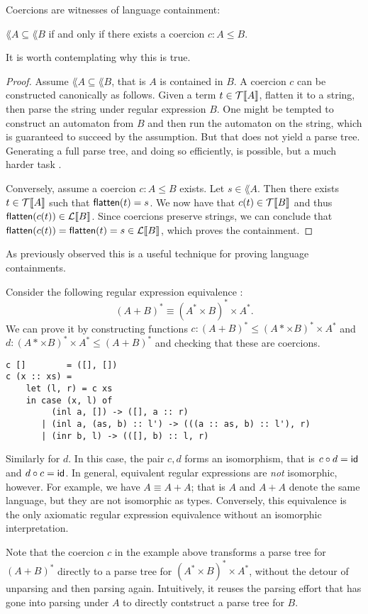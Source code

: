 Coercions are witnesses of language containment:
\begin{proposition}
$\lang{A} \subseteq \lang{B}$ if and only if there exists a coercion $c : A \leq B$.
\end{proposition}
It is worth contemplating why this is true.
\begin{proof}
Assume $\lang{A} \subseteq \lang{B}$, that is $A$ is contained in $B$.  A coercion $c$ can be constructed canonically as follows.
Given a term $t \in \mathcal{T}\llbracket A \rrbracket$, flatten it to a string, then parse the string under regular expression $B$.  One might be tempted to construct an automaton from $B$ and then run the automaton on the string, which is guaranteed to succeed by the assumption.  But that does not yield a parse tree.  Generating a full parse tree, and doing so efficiently, is possible, but a much harder task \cite{frca2004,ghrst2016}.  

Conversely, assume a coercion $c : A \leq B$ exists. Let $s \in \lang{A}$.  
Then there exists $t \in \mathcal{T}\llbracket A \rrbracket$ such that $\mathsf{flatten}(t) = s$.  
We now have that $c(t) \in \mathcal{T}\llbracket B \rrbracket$ and thus $\mathsf{flatten}(c(t)) \in \mathcal{L}\llbracket B \rrbracket$.  
Since coercions preserve strings, we can conclude that 
$\mathsf{flatten}(c(t)) = \mathsf{flatten}(t) = s \in \mathcal{L}\llbracket B \rrbracket$, which proves the containment.
\end{proof}

As previously observed \cite{ghrst2016} this is a useful technique for proving language containments.
\begin{example}
\label{C11-example}
Consider the following regular expression equivalence \cite[Rule C11, p.~25]{conway71}:
$$(A + B)^* \equiv (A^* \times B)^* \times A^*.$$
We can prove it by constructing functions $c : (A + B)^* \leq (A* \times B)^* \times A^*$ and $d : (A* \times B)^* \times A^* \leq (A + B)^*$
and checking that these are coercions.
\begin{verbatim}
c []        = ([], [])
c (x :: xs) = 
	let (l, r) = c xs
	in case (x, l) of
	     (inl a, []) -> ([], a :: r)
	   | (inl a, (as, b) :: l') -> (((a :: as, b) :: l'), r)
	   | (inr b, l) -> (([], b) :: l, r)
\end{verbatim}
Similarly for $d$.  In this case, the pair $c, d$ forms an isomorphism, that is $c \circ d = \mathsf{id}$ and $d \circ c = \mathsf{id}$.  In general, equivalent regular expressions are \emph{not} isomorphic, however. For example, we have $A \equiv A + A$; that is $A$ and $A + A$ denote the same language, but they are not isomorphic as types. Conversely, this equivalence is the only axiomatic regular expression equivalence without an isomorphic interpretation. 
\end{example}
Note that the coercion $c$ in the example above transforms a parse tree for $(A + B)^*$ directly to a parse tree for $(A^* \times B)^* \times A^*$, without the detour of unparsing and then parsing again. Intuitively, it reuses the parsing effort that has gone into parsing under $A$ to directly contstruct a parse tree for $B$.

